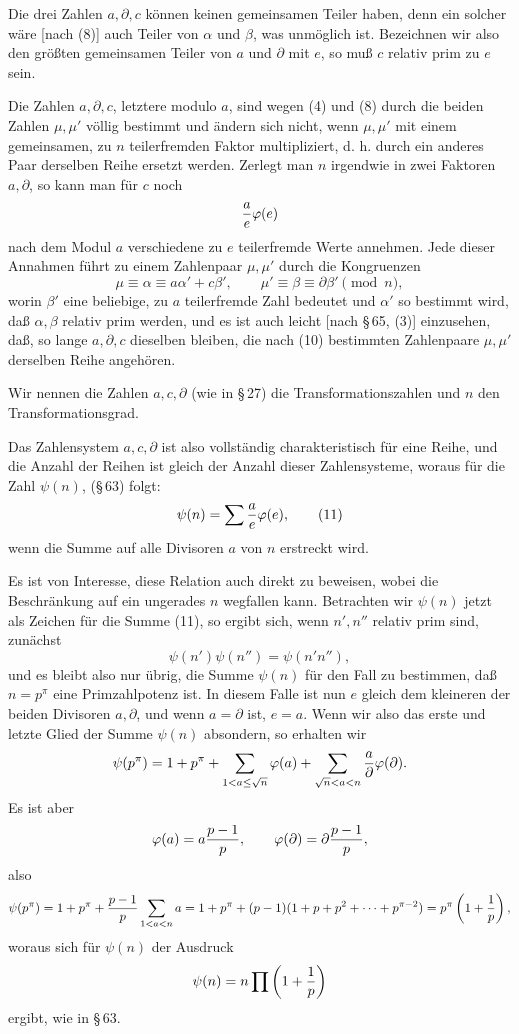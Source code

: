 \documentclass[11pt]{article}
\begin{document}
Die drei Zahlen $a,\partial,c$ können keinen gemeinsamen Teiler haben, denn ein solcher
wäre [nach (8)] auch Teiler von $\alpha$ und $\beta$, was unmöglich ist. Bezeichnen wir also
den größten gemeinsamen Teiler von $a$ und $\partial$ mit $e$, so muß $c$ relativ prim zu
$e$ sein.

Die Zahlen $a,\partial,c$, letztere modulo $a$, sind wegen (4) und (8) durch die beiden
Zahlen $\mu,\mu'$ völlig bestimmt und ändern sich nicht, wenn $\mu,\mu'$ mit einem
gemeinsamen, zu $n$ teilerfremden Faktor multipliziert, d. h. durch ein anderes Paar derselben
Reihe ersetzt werden. Zerlegt man $n$ irgendwie in zwei Faktoren $a,\partial$, so kann man
für $c$ noch
\[
 {a\over e}\varphi(e)
\]
nach dem Modul $a$ verschiedene zu $e$ teilerfremde Werte annehmen. Jede dieser Annahmen
führt zu einem Zahlenpaar $\mu,\mu'$ durch die Kongruenzen
\begin{equation}
 \mu\equiv\alpha\equiv a\alpha'+c\beta',
 \qquad
 \mu'\equiv\beta\equiv\partial\beta'\pmod n,
\tag{10}
\end{equation}
worin $\beta'$ eine beliebige, zu $a$ teilerfremde Zahl bedeutet und $\alpha'$ so bestimmt
wird, daß $\alpha,\beta$ relativ prim werden, und es ist auch leicht [nach \S\,65, (3)]
einzusehen, daß, so lange $a,\partial,c$ dieselben bleiben, die nach (10) bestimmten
Zahlenpaare $\mu,\mu'$ derselben Reihe angehören.

Wir nennen die Zahlen $a,c,\partial$ (wie in \S\,27) die Transformationszahlen und $n$ den
Transformationsgrad.

Das Zahlensystem $a,c,\partial$ ist also vollständig charakteristisch für eine Reihe, und die
Anzahl der Reihen ist gleich der Anzahl dieser Zahlensysteme, woraus für die Zahl
$\psi(n)$, (\S\,63) folgt:
\begin{equation}
 \psi(n)=\sum {a\over e}\varphi(e),
\tag{11}
\end{equation}
wenn die Summe auf alle Divisoren $a$ von $n$ erstreckt wird.

Es ist von Interesse, diese Relation auch direkt zu beweisen, wobei die Beschränkung auf
ein ungerades $n$ wegfallen kann. Betrachten wir $\psi(n)$ jetzt als Zeichen für die Summe
(11), so ergibt sich, wenn $n',n''$ relativ prim sind, zunächst
\[
 \psi(n')\psi(n'')=\psi(n'n''),
\]
und es bleibt also nur übrig, die Summe $\psi(n)$ für den Fall zu bestimmen, daß
$n=p^\pi$ eine Primzahlpotenz ist. In diesem Falle ist nun $e$ gleich dem kleineren der
beiden Divisoren $a,\partial$, und wenn $a=\partial$ ist, $e=a$. Wenn wir also das erste und
letzte Glied der Summe $\psi(n)$ absondern, so erhalten wir
\[
 \psi(p^\pi)=1+p^\pi+
 \sum_{1<a\le\sqrt n}\varphi(a)+
 \sum_{\sqrt n<a<n}{a\over\partial}\varphi(\partial).
\]
Es ist aber
\[
 \varphi(a)=a{p-1\over p},
 \qquad
 \varphi(\partial)=\partial {p-1\over p},
\]
also
\[
 \psi(p^\pi)=1+p^\pi+{p-1\over p}
 \sum_{1<a<n}a
 =1+p^\pi+(p-1)(1+p+p^2+\cdots+p^{\pi-2})
 =p^\pi\left(1+{1\over p}\right),
\]
woraus sich für $\psi(n)$ der Ausdruck
\[
 \psi(n)=n\prod\left(1+{1\over p}\right)
\]
ergibt, wie in \S\,63.
\end{document}

